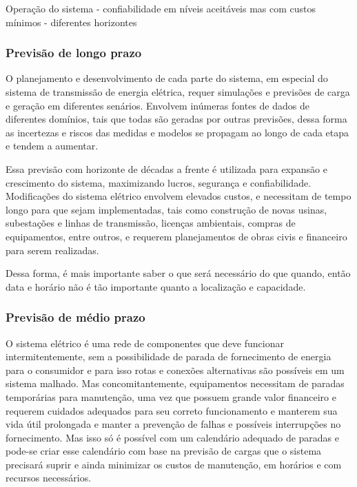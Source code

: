 \documentclass[
	12pt,				%
	oneside,			%
	a4paper,			%
	english,			%
	brazil				%
	]{abntex2}
\begin{document}
	Operação do sistema - confiabilidade em níveis aceitáveis mas com custos mínimos  - diferentes horizontes

\subsubsection{Previsão de longo prazo}
	O planejamento e desenvolvimento de cada parte do sistema, em especial do sistema de transmissão de energia elétrica, requer simulações e previsões de carga e geração em diferentes senários. Envolvem inúmeras fontes de dados de diferentes domínios, tais que todas são geradas por outras previsões, dessa forma as incertezas e riscos das medidas e modelos se propagam ao longo de cada etapa e tendem a aumentar. 
	
	Essa previsão com horizonte de décadas a frente é utilizada para expansão e crescimento do sistema, maximizando lucros, segurança e confiabilidade. Modificações do sistema elétrico envolvem elevados custos, e necessitam de tempo longo para que sejam implementadas, tais como construção de novas usinas, subestações e linhas de transmissão, licenças ambientais, compras de equipamentos, entre outros, e requerem planejamentos de obras civis e financeiro para serem realizadas.  
	
	Dessa forma, é mais importante saber o que será necessário do que quando, então data e horário não é tão importante quanto a localização e capacidade. 	
	
	
	
\subsubsection{Previsão de médio prazo}
	
	O sistema elétrico é uma rede de componentes que deve funcionar intermitentemente, sem a possibilidade de parada de fornecimento de energia para o consumidor e para isso rotas e conexões alternativas são possíveis em um sistema malhado. Mas concomitantemente, equipamentos necessitam de paradas temporárias para manutenção, uma vez que possuem grande valor financeiro e requerem cuidados adequados para seu correto funcionamento e manterem sua vida útil prolongada e manter a prevenção de falhas e possíveis interrupções no fornecimento. Mas isso só é possível com um calendário adequado de paradas e pode-se criar esse calendário com base na previsão de cargas que o sistema precisará suprir e ainda minimizar os custos de manutenção, em horários e com recursos necessários. 
	
\end{document}
